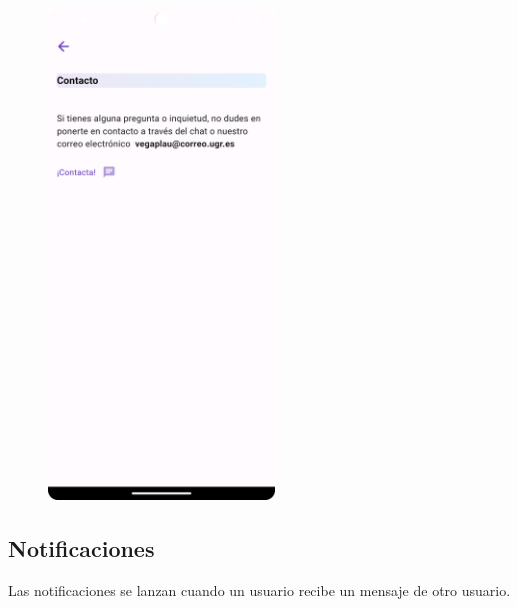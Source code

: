 \documentclass[a4paper, 12pt]{article}
\begin{document}
\begin{figure}[H]
	\begin{center}
		{\includegraphics[width=6cm]{app/ContactPage.png}\par}
	\end{center}  
\end{figure}

\newpage
\subsection*{Notificaciones}

Las notificaciones se lanzan cuando un usuario recibe un mensaje de otro usuario.
\end{document}
